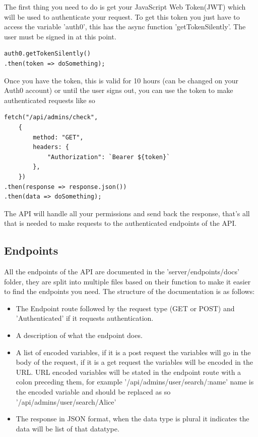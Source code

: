 \documentclass[12pt]{article}
\begin{document}
\noindent
The first thing you need to do is get your JavaScript Web Token(JWT) which will be used to authenticate your request. To get this token you just have to access the variable 'auth0', this has the async function 'getTokenSilently'. The user must be signed in at this point.
\vspace{0.5cm}
\begin{lstlisting}
auth0.getTokenSilently()
.then(token => doSomething);
\end{lstlisting}
\vspace{0.5cm}
\noindent
Once you have the token, this is valid for 10 hours (can be changed on your Auth0 account) or until the user signs out, you can use the token to make authenticated requests like so
\vspace{0.5cm}
\begin{lstlisting}
fetch("/api/admins/check",
	{
		method: "GET",
		headers: {
			"Authorization": `Bearer ${token}`
		},
	})
.then(response => response.json())
.then(data => doSomething);
\end{lstlisting}
\vspace{0.5cm}
\noindent
The API will handle all your permissions and send back the response, that's all that is needed to make requests to the authenticated endpoints of the API.


\subsection{Endpoints}
All the endpoints of the API are documented in the 'server/endpoints/docs' folder, they are split into multiple files based on their function to make it easier to find the endpoints you need. The structure of the documentation is as follows:\\
\noindent
\begin{itemize}
\item The Endpoint route followed by the request type (GET or POST) and 'Authenticated' if it requests authentication.
\item A description of what the endpoint does.
\item A list of encoded variables, if it is a post request the variables will go in the body of the request, if it is a get request the variables will be encoded in the URL. URL encoded variables will be stated in the endpoint route with a colon preceding them, for example '/api/admins/user/search/:name' name is the encoded variable and should be replaced as so '/api/admins/user/search/Alice'
\item The response in JSON format, when the data type is plural it indicates the data will be list of that datatype. 

\end{itemize}
\end{document}

